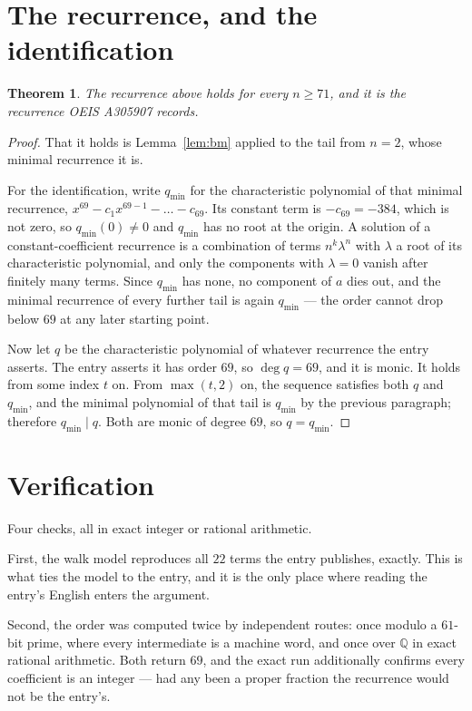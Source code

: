 \documentclass[11pt,a4paper]{article}
\theoremstyle{plain}
\newtheorem{theorem}{Theorem}
\theoremstyle{definition}
\begin{document}
\section{The recurrence, and the identification}

\begin{theorem}
The recurrence above holds for every $n\ge71$, and it is the recurrence OEIS A305907 records.
\end{theorem}

\begin{proof}
That it holds is Lemma~\ref{lem:bm} applied to the tail from $n=2$, whose minimal
recurrence it is.

For the identification, write $q_{\min}$ for the characteristic polynomial of that minimal
recurrence, $x^{69}-c_1x^{69-1}-\dots-c_{69}$. Its constant term is
$-c_{69}=-384$, which is not zero, so $q_{\min}(0)\neq0$ and $q_{\min}$ has no
root at the origin. A solution of a constant-coefficient recurrence is a combination of terms
$n^{k}\lambda^{n}$ with $\lambda$ a root of its characteristic polynomial, and only the
components with $\lambda=0$ vanish after finitely many terms. Since $q_{\min}$ has none, no
component of $a$ dies out, and the minimal recurrence of every further tail is again
$q_{\min}$ --- the order cannot drop below $69$ at any later starting point.

Now let $q$ be the characteristic polynomial of whatever recurrence the entry asserts. The
entry asserts it has order $69$, so $\deg q=69$, and it is monic. It holds from some
index $t$ on. From $\max(t,2)$ on, the sequence satisfies both $q$ and $q_{\min}$, and
the minimal polynomial of that tail is $q_{\min}$ by the previous paragraph; therefore
$q_{\min}\mid q$. Both are monic of degree $69$, so $q=q_{\min}$.
\end{proof}

\section{Verification}

Four checks, all in exact integer or rational arithmetic.

First, the walk model reproduces all $22$ terms the entry publishes, exactly. This is
what ties the model to the entry, and it is the only place where reading the entry's English
enters the argument.

Second, the order was computed twice by independent routes: once modulo a $61$-bit prime, where
every intermediate is a machine word, and once over $\mathbb{Q}$ in exact rational arithmetic.
Both return $69$, and the exact run additionally confirms every coefficient is an integer
--- had any been a proper fraction the recurrence would not be the entry's.
\end{document}
